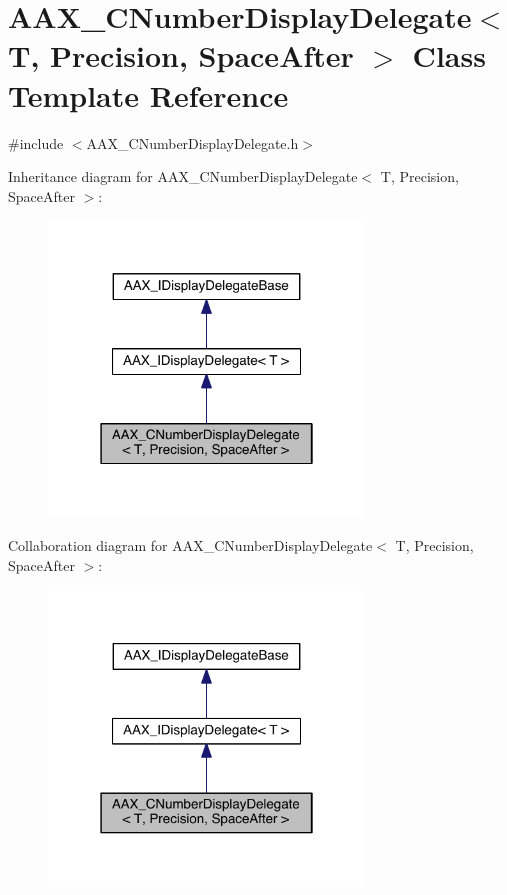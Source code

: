 \hypertarget{a00028}{}\section{A\+A\+X\+\_\+\+C\+Number\+Display\+Delegate$<$ T, Precision, Space\+After $>$ Class Template Reference}
\label{a00028}


{\ttfamily \#include $<$A\+A\+X\+\_\+\+C\+Number\+Display\+Delegate.\+h$>$}



Inheritance diagram for A\+A\+X\+\_\+\+C\+Number\+Display\+Delegate$<$ T, Precision, Space\+After $>$\+:
\nopagebreak
\begin{figure}[H]
\begin{center}
\leavevmode
\includegraphics[width=238pt]{a00438}
\end{center}
\end{figure}


Collaboration diagram for A\+A\+X\+\_\+\+C\+Number\+Display\+Delegate$<$ T, Precision, Space\+After $>$\+:
\nopagebreak
\begin{figure}[H]
\begin{center}
\leavevmode
\includegraphics[width=238pt]{a00439}
\end{center}
\end{figure}


